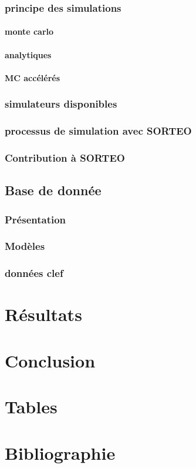 \documentclass[12pt]{book}
\begin{document}
		\section{principe des simulations}
			\subsection{monte carlo}
			\subsection{analytiques}
			\subsection{MC accélérés}

		\section{simulateurs disponibles}
		\section{processus de simulation avec SORTEO}
		\section{Contribution à SORTEO}

	\chapter{Base de donnée}
		\section{Présentation}
		\section{Modèles}
		\section{données clef} %


\part{Résultats}
	


\part{Conclusion}

\part{Tables}

\listoffigures

\listoftables

\part{Bibliographie}


\end{document}

